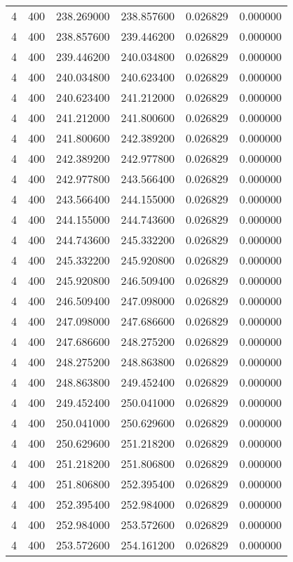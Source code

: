 \begin{longtable}{rrrrrr}
4 & 400 & 238.269000 & 238.857600 & 0.026829 & 0.000000 \\
4 & 400 & 238.857600 & 239.446200 & 0.026829 & 0.000000 \\
4 & 400 & 239.446200 & 240.034800 & 0.026829 & 0.000000 \\
4 & 400 & 240.034800 & 240.623400 & 0.026829 & 0.000000 \\
4 & 400 & 240.623400 & 241.212000 & 0.026829 & 0.000000 \\
4 & 400 & 241.212000 & 241.800600 & 0.026829 & 0.000000 \\
4 & 400 & 241.800600 & 242.389200 & 0.026829 & 0.000000 \\
4 & 400 & 242.389200 & 242.977800 & 0.026829 & 0.000000 \\
4 & 400 & 242.977800 & 243.566400 & 0.026829 & 0.000000 \\
4 & 400 & 243.566400 & 244.155000 & 0.026829 & 0.000000 \\
4 & 400 & 244.155000 & 244.743600 & 0.026829 & 0.000000 \\
4 & 400 & 244.743600 & 245.332200 & 0.026829 & 0.000000 \\
4 & 400 & 245.332200 & 245.920800 & 0.026829 & 0.000000 \\
4 & 400 & 245.920800 & 246.509400 & 0.026829 & 0.000000 \\
4 & 400 & 246.509400 & 247.098000 & 0.026829 & 0.000000 \\
4 & 400 & 247.098000 & 247.686600 & 0.026829 & 0.000000 \\
4 & 400 & 247.686600 & 248.275200 & 0.026829 & 0.000000 \\
4 & 400 & 248.275200 & 248.863800 & 0.026829 & 0.000000 \\
4 & 400 & 248.863800 & 249.452400 & 0.026829 & 0.000000 \\
4 & 400 & 249.452400 & 250.041000 & 0.026829 & 0.000000 \\
4 & 400 & 250.041000 & 250.629600 & 0.026829 & 0.000000 \\
4 & 400 & 250.629600 & 251.218200 & 0.026829 & 0.000000 \\
4 & 400 & 251.218200 & 251.806800 & 0.026829 & 0.000000 \\
4 & 400 & 251.806800 & 252.395400 & 0.026829 & 0.000000 \\
4 & 400 & 252.395400 & 252.984000 & 0.026829 & 0.000000 \\
4 & 400 & 252.984000 & 253.572600 & 0.026829 & 0.000000 \\
4 & 400 & 253.572600 & 254.161200 & 0.026829 & 0.000000 \\

\end{longtable}
